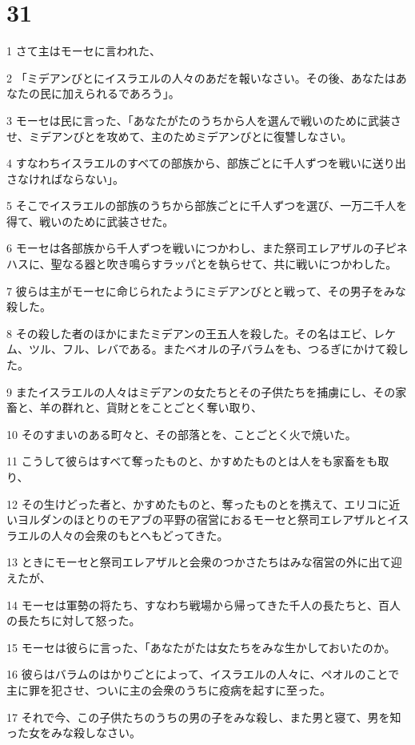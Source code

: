 \chapter{31}

\par 1 さて主はモーセに言われた、
\par 2 「ミデアンびとにイスラエルの人々のあだを報いなさい。その後、あなたはあなたの民に加えられるであろう」。
\par 3 モーセは民に言った、「あなたがたのうちから人を選んで戦いのために武装させ、ミデアンびとを攻めて、主のためミデアンびとに復讐しなさい。
\par 4 すなわちイスラエルのすべての部族から、部族ごとに千人ずつを戦いに送り出さなければならない」。
\par 5 そこでイスラエルの部族のうちから部族ごとに千人ずつを選び、一万二千人を得て、戦いのために武装させた。
\par 6 モーセは各部族から千人ずつを戦いにつかわし、また祭司エレアザルの子ピネハスに、聖なる器と吹き鳴らすラッパとを執らせて、共に戦いにつかわした。
\par 7 彼らは主がモーセに命じられたようにミデアンびとと戦って、その男子をみな殺した。
\par 8 その殺した者のほかにまたミデアンの王五人を殺した。その名はエビ、レケム、ツル、フル、レバである。またベオルの子バラムをも、つるぎにかけて殺した。
\par 9 またイスラエルの人々はミデアンの女たちとその子供たちを捕虜にし、その家畜と、羊の群れと、貨財とをことごとく奪い取り、
\par 10 そのすまいのある町々と、その部落とを、ことごとく火で焼いた。
\par 11 こうして彼らはすべて奪ったものと、かすめたものとは人をも家畜をも取り、
\par 12 その生けどった者と、かすめたものと、奪ったものとを携えて、エリコに近いヨルダンのほとりのモアブの平野の宿営におるモーセと祭司エレアザルとイスラエルの人々の会衆のもとへもどってきた。
\par 13 ときにモーセと祭司エレアザルと会衆のつかさたちはみな宿営の外に出て迎えたが、
\par 14 モーセは軍勢の将たち、すなわち戦場から帰ってきた千人の長たちと、百人の長たちに対して怒った。
\par 15 モーセは彼らに言った、「あなたがたは女たちをみな生かしておいたのか。
\par 16 彼らはバラムのはかりごとによって、イスラエルの人々に、ペオルのことで主に罪を犯させ、ついに主の会衆のうちに疫病を起すに至った。
\par 17 それで今、この子供たちのうちの男の子をみな殺し、また男と寝て、男を知った女をみな殺しなさい。

